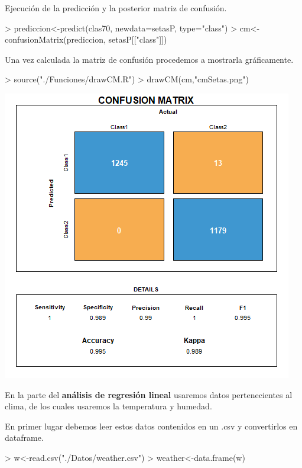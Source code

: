 \documentclass [a4paper] {article}
\begin{document}
\bigskip
Ejecución de la predicción y la posterior matriz de confusión.
\begin{Schunk}
\begin{Sinput}
> prediccion<-predict(clas70, newdata=setasP, type="class")
> cm<-confusionMatrix(prediccion, setasP[["class"]])
\end{Sinput}
\end{Schunk}

\bigskip
Una vez calculada la matriz de confusión procedemos a mostrarla gráficamente.
\begin{Schunk}
\begin{Sinput}
> source("./Funciones/drawCM.R")
> drawCM(cm,"cmSetas.png")
\end{Sinput}
\end{Schunk}
\includegraphics[width=\textwidth]{cmSetas}

\bigskip
En la parte del \textbf{análisis de regresión lineal} usaremos datos pertenecientes al clima, de los cuales usaremos la 
temperatura y humedad.

\bigskip
En primer lugar debemos leer estos datos contenidos en un .csv y convertirlos en dataframe.
\begin{Schunk}
\begin{Sinput}
> w<-read.csv("./Datos/weather.csv")
> weather<-data.frame(w)
\end{Sinput}
\end{Schunk}
\end{document}
